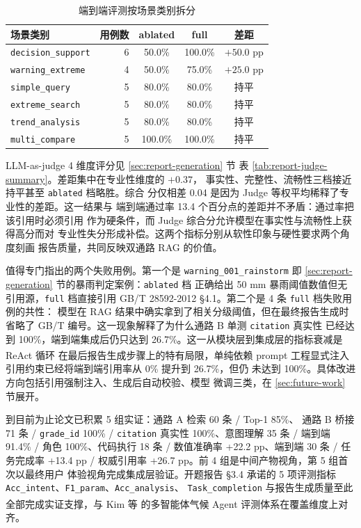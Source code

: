 \documentclass[a4paper]{article}
\newcommand{\song}{\CJKfamily{song}}
\newcommand{\wuhao}{\fontsize{10.5pt}{18pt}\selectfont}
\theoremstyle{definition}
\theoremstyle{plain}
\theoremstyle{remark}
\newcommand{\reftab}[1]{表 \ref{#1}}
\let\oldcite\cite
\renewcommand{\cite}[1]{\textsuperscript{\oldcite{#1}}}
\newcommand{\bk}{\discretionary{}{}{}}
\begin{document}
\begin{table}[H]
    \centering
    \caption{端到端评测按场景类别拆分}
    \label{tab:e2e-by-category}
    \song\wuhao
    \begin{tabular}{lrccc}
        \toprule
        场景类别 & 用例数 & ablated & full & 差距 \\
        \midrule
        \texttt{decision\_\bk{}support} & 6 & 50.0\% & 100.0\% & $+50.0$ pp \\
        \texttt{warning\_\bk{}extreme} & 4 & 50.0\% & 75.0\% & $+25.0$ pp \\
        \texttt{simple\_\bk{}query} & 5 & 80.0\% & 80.0\% & 持平 \\
        \texttt{extreme\_\bk{}search} & 5 & 80.0\% & 80.0\% & 持平 \\
        \texttt{trend\_\bk{}analysis} & 5 & 80.0\% & 80.0\% & 持平 \\
        \texttt{multi\_\bk{}compare} & 5 & 100.0\% & 100.0\% & 持平 \\
        \bottomrule
    \end{tabular}
\end{table}

LLM-as-judge 4 维度评分见 \ref{sec:report-generation} 节
\reftab{tab:report-judge-summary}。差距集中在专业性维度的 $+0.37$，
事实性、完整性、流畅性三档接近持平甚至 \texttt{ablated} 档略胜。综合
分仅相差 0.04 是因为 Judge 等权平均稀释了专业性的差距。这一结果与
端到端通过率 13.4 个百分点的差距并不矛盾：通过率把该引用时必须引用
作为硬条件，而 Judge 综合分允许模型在事实性与流畅性上获得高分而对
专业性失分形成补偿。这两个指标分别从软性印象与硬性要求两个角度刻画
报告质量，共同反映双通路 RAG 的价值。

值得专门指出的两个失败用例。第一个是 \texttt{warning\_\bk{}001\_\bk{}rainstorm}
即 \ref{sec:report-generation} 节的暴雨判定案例：\texttt{ablated} 档
正确给出 50 mm 暴雨阈值数值但无引用源，\texttt{full} 档直接引用
GB/T 28592-2012 §4.1。第二个是 4 条 \texttt{full} 档失败用例的共性：
模型在 RAG 结果中确实拿到了相关分级阈值，但在最终报告生成时省略了
GB/T 编号。这一现象解释了为什么通路 B 单测 \texttt{citation} 真实性
已经达到 100\%，端到端集成后仍只达到 26.7\%。这一从模块层到集成层的指标衰减是 ReAct
循环 \cite{ref18} 在最后报告生成步骤上的特有局限，单纯依赖 prompt
工程显式注入引用约束已经将端到端引用率从 0\% 提升到 26.7\%，但仍
未达到 100\%。具体改进方向包括引用强制注入、生成后自动校验、模型
微调三类，在 \ref{sec:future-work} 节展开。

到目前为止论文已积累 5 组实证：通路 A 检索 60 条 / Top-1 85\%、
通路 B 桥接 71 条 / \texttt{grade\_\bk{}id} 100\% / \texttt{citation}
真实性 100\%、意图理解 35 条 / 端到端 91.4\% / 角色 100\%、代码执行
18 条 / 数值准确率 +22.2 pp、端到端 30 条 / 任务完成率 +13.4 pp /
权威引用率 +26.7 pp。前 4 组是中间产物视角，第 5 组首次以最终用户
体验视角完成集成层验证。开题报告 §3.4 承诺的 5 项评测指标
\texttt{Acc\_\bk{}intent}、\texttt{F1\_\bk{}param}、\texttt{Acc\_\bk{}analysis}、
\texttt{Task\_\bk{}completion} 与报告生成质量至此全部完成实证支撑，与
Kim 等 \cite{ref1} 的多智能体气候 Agent 评测体系在覆盖维度上对齐。
\end{document}
